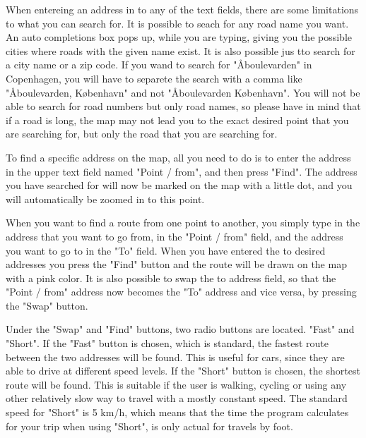 When entereing an address in to any of the text fields, there are some limitations to what you can search for. It is possible to seach for any road name you want. An auto completions box pops up, while you are typing, giving you the possible cities where roads with the given name exist. It is also possible jus tto search for a city name or a zip code. If you wand to search for "\AA boulevarden" in Copenhagen, you will have to separete the search with a comma like "\AA boulevarden, K\o benhavn" and not "\AA boulevarden K\o benhavn". You will not be able to search for road numbers but only road names, so please have in mind that if a road is long, the map may not lead you to the exact desired point that you are searching for, but only the road that you are searching for.

To find a specific address on the map, all you need to do is to enter the address in the upper text field named "Point / from", and then press "Find". The address you have searched for will now be marked on the map with a little dot, and you will automatically be zoomed in to this point.

When you want to find a route from one point to another, you simply type in the address that you want to go from, in the "Point / from" field, and the address you want to go to in the "To" field. When you have entered the to desired addresses you press the "Find" button and the route will be drawn on the map with a pink color. 
It is also possible to swap the to address field, so that the "Point / from" address now becomes the "To" address and vice versa, by pressing the "Swap" button.

Under the "Swap" and "Find" buttons, two radio buttons are located. "Fast" and "Short". If the "Fast" button is chosen, which is standard, the fastest route between the two addresses will be found. This is useful for cars, since they are able to drive at different speed levels. If the "Short" button is chosen, the shortest route will be found. This is suitable if the user is walking, cycling or using any other relatively slow way to travel with a mostly constant speed. The standard speed for "Short" is 5 km/h, which means that the time the program calculates for your trip when using "Short", is only actual for travels by foot.

